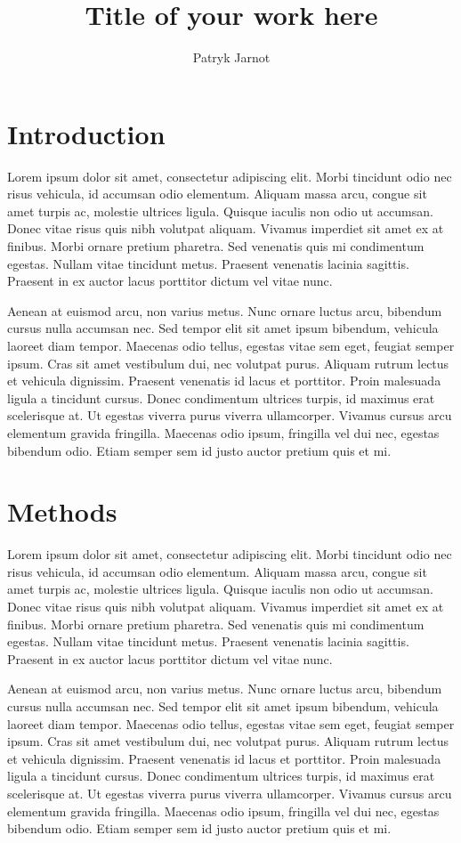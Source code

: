 \documentclass[twocolumn]{miniclass}
\title{Title of your work here}
\author[1,$\ast$]{Patryk Jarnot}
\affil[1]{Department of Computer Network and Systems, Silesian University of Technology}
\affil[$\ast$]{patryk.jarnot@polsl.pl}
\date{}
\begin{document}
\maketitle

\section{Introduction}
Lorem ipsum dolor sit amet, consectetur adipiscing elit. Morbi tincidunt odio nec risus vehicula, id accumsan odio elementum. Aliquam massa arcu, congue sit amet turpis ac, molestie ultrices ligula. Quisque iaculis non odio ut accumsan. Donec vitae risus quis nibh volutpat aliquam. Vivamus imperdiet sit amet ex at finibus. Morbi ornare pretium pharetra. Sed venenatis quis mi condimentum egestas. Nullam vitae tincidunt metus. Praesent venenatis lacinia sagittis. Praesent in ex auctor lacus porttitor dictum vel vitae nunc.

Aenean at euismod arcu, non varius metus. Nunc ornare luctus arcu, bibendum cursus nulla accumsan nec. Sed tempor elit sit amet ipsum bibendum, vehicula laoreet diam tempor. Maecenas odio tellus, egestas vitae sem eget, feugiat semper ipsum. Cras sit amet vestibulum dui, nec volutpat purus. Aliquam rutrum lectus et vehicula dignissim. Praesent venenatis id lacus et porttitor. Proin malesuada ligula a tincidunt cursus. Donec condimentum ultrices turpis, id maximus erat scelerisque at. Ut egestas viverra purus viverra ullamcorper. Vivamus cursus arcu elementum gravida fringilla. Maecenas odio ipsum, fringilla vel dui nec, egestas bibendum odio. Etiam semper sem id justo auctor pretium quis et mi.

\section{Methods}
Lorem ipsum dolor sit amet, consectetur adipiscing elit. Morbi tincidunt odio nec risus vehicula, id accumsan odio elementum. Aliquam massa arcu, congue sit amet turpis ac, molestie ultrices ligula. Quisque iaculis non odio ut accumsan. Donec vitae risus quis nibh volutpat aliquam. Vivamus imperdiet sit amet ex at finibus. Morbi ornare pretium pharetra. Sed venenatis quis mi condimentum egestas. Nullam vitae tincidunt metus. Praesent venenatis lacinia sagittis. Praesent in ex auctor lacus porttitor dictum vel vitae nunc.

Aenean at euismod arcu, non varius metus. Nunc ornare luctus arcu, bibendum cursus nulla accumsan nec. Sed tempor elit sit amet ipsum bibendum, vehicula laoreet diam tempor. Maecenas odio tellus, egestas vitae sem eget, feugiat semper ipsum. Cras sit amet vestibulum dui, nec volutpat purus. Aliquam rutrum lectus et vehicula dignissim. Praesent venenatis id lacus et porttitor. Proin malesuada ligula a tincidunt cursus. Donec condimentum ultrices turpis, id maximus erat scelerisque at. Ut egestas viverra purus viverra ullamcorper. Vivamus cursus arcu elementum gravida fringilla. Maecenas odio ipsum, fringilla vel dui nec, egestas bibendum odio. Etiam semper sem id justo auctor pretium quis et mi.
\end{document}

